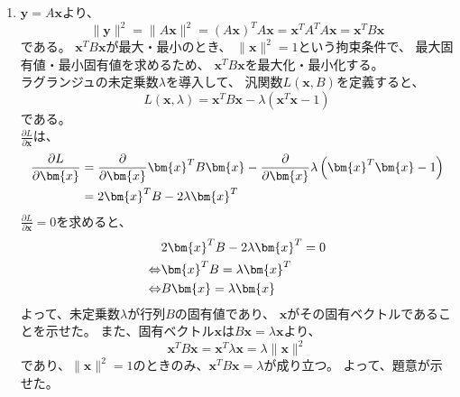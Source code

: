 \begin{enumerate}
  \item \(\bm{y} = A \bm{x}\)より、
  \begin{equation}\label{equation:3_3_a_1}
    \|\bm{y}\|^{2}
    = \|A \bm{x}\|^{2}
    = \left(A \bm{x}\right)^{T} A \bm{x}
    = \bm{x}^{T} A^{T} A \bm{x}
    = \bm{x}^{T} B \bm{x}
  \end{equation}
  である。
  \(\bm{x}^{T} B \bm{x} \)が最大・最小のとき、
  \(\|\bm{x}\|^{2} = 1\)という拘束条件で、
  最大固有値・最小固有値を求めるため、
  \(\bm{x}^{T} B \bm{x}\)を最大化・最小化する。\\
  ラグランジュの未定乗数\(\lambda\)を導入して、
  汎関数\(L\left(\bm{x}, B\right)\)を定義すると、
  \begin{equation}\label{equation:3_3_a_2}
    L\left(\bm{x}, \lambda\right) = \bm{x}^{T} B \bm{x} - \lambda \left(\bm{x}^{T} \bm{x} - 1\right)
  \end{equation}
  である。\\
  \(\frac{\partial L}{\partial \bm{x}}\)は、
  \begin{align}\label{equation:3_3_a_3}
    \frac{\partial L}{\partial \bm{x}}
    &= \frac{\partial}{\partial \bm{x}} \bm{x}^{T} B \bm{x} - \frac{\partial}{\partial \bm{x}} \lambda \left(\bm{x}^{T} \bm{x} - 1\right) \notag\\
    &= 2 \bm{x}^{T} B - 2 \lambda \bm{x}^{T}
  \end{align}
  \(\frac{\partial L}{\partial \bm{x}} = 0\)を求めると、
  \begin{align}\label{equation:3_3_a_4}
    & 2 \bm{x}^{T} B - 2 \lambda \bm{x}^{T} = 0 \notag\\
    \Leftrightarrow & \bm{x}^{T} B = \lambda \bm{x}^{T} \notag\\
    \Leftrightarrow & B \bm{x} = \lambda \bm{x}
  \end{align}
  よって、未定乗数\(\lambda\)が行列\(B\)の固有値であり、
  \(\bm{x}\)がその固有ベクトルであることを示せた。
  また、固有ベクトル\(\bm{x}\)は\(B \bm{x} = \lambda \bm{x}\)より、
  \begin{equation}\label{equation:3_3_a_5}
    \bm{x}^{T} B \bm{x} =  \bm{x}^{T} \lambda \bm{x} = \lambda \|\bm{x}\|^{2}
  \end{equation}
  であり、\(\|\bm{x}\|^{2} = 1\)のときのみ、\(\bm{x}^{T} B \bm{x} = \lambda\)が成り立つ。
  よって、題意が示せた。\\


\end{enumerate}

